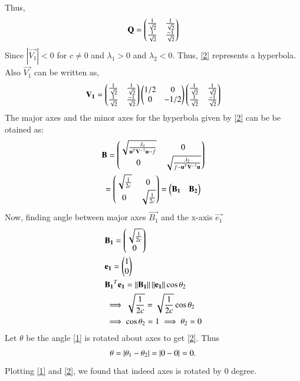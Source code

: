 \documentclass[journal,12pt,twocolumn]{IEEEtran}
\begin{document}
Thus, 
\begin{align}
	\mathbf{Q} = \begin{pmatrix}\frac{1}{\sqrt{2}} & \frac{1}{\sqrt{2}} \\ \frac{1}{\sqrt{2}} & \frac{-1}{\sqrt{2}}\end{pmatrix}
\end{align}
Since $|\vec{V_1}| <0$ for $c \not= 0$ and $\lambda_1 >0$ and $\lambda_2< 0$. Thus, \eqref{2} represents a hyperbola.\\
Also $\vec{V_1}$ can be written as,
\begin{align}
	\mathbf{V_1} = \begin{pmatrix}\frac{1}{\sqrt{2}} & \frac{1}{\sqrt{2}} \\ \frac{1}{\sqrt{2}} & \frac{-1}{\sqrt{2}}\end{pmatrix} 
	\begin{pmatrix}1/2 & 0 \\ 0 & -1/2 \end{pmatrix}\begin{pmatrix}\frac{1}{\sqrt{2}} & \frac{1}{\sqrt{2}} \\ \frac{1}{\sqrt{2}} & \frac{-1}{\sqrt{2}}\end{pmatrix}
\end{align}
The major axes and the minor axes for the hyperbola given by \eqref{2} can be be otained as:
\begin{multline}
	\mathbf{B} = \begin{pmatrix}\sqrt{\frac{\lambda_1}{\mathbf{u}^T\mathbf{V^-}^1\mathbf{u}-f}} & 0 \\ 0 & \sqrt{\frac{\lambda_2}{f-\mathbf{u}^T\mathbf{V^-}^1\mathbf{u}}} \end{pmatrix} \\ = \begin{pmatrix}\sqrt{\frac{1}{2c}} & 0 \\ 0 & \sqrt{\frac{1}{2c}} \end{pmatrix} =
	\begin{pmatrix}\mathbf{B_1} & \mathbf{B_2}\end{pmatrix}
\end{multline}
Now, finding angle between major axes $\vec{B_1}$ and the x-axis $\vec{e_1}$
\begin{align}
	& \mathbf{B_1} = \begin{pmatrix}\sqrt{\frac{1}{2c}} \\ 0\end{pmatrix}  \\
	& \mathbf{e_1} = \begin{pmatrix}1 \\ 0\end{pmatrix} \\
	& \mathbf{B_1}^T\mathbf{e_1} = \left\lVert\mathbf{B_1}\right\rVert\left\lVert\mathbf{e_1}\right\rVert\cos\theta_2 \\
	& \implies \sqrt{\frac{1}{2c}} = \sqrt{\frac{1}{2c}} \cos\theta_2 \\
	& \implies \cos\theta_2 = 1 \implies \theta_2 = 0 \label{6}
\end{align}
Let $\theta$ be the angle \eqref{1} is rotated about axes to get \eqref{2}. Thus
\begin{align}
	\theta = \left\vert\theta_1- \theta_2\right\vert = \left\vert0 - 0 \right\vert = 0.
\end{align}
Plotting \eqref{1} and \eqref{2}, we found that indeed axes is rotated by $0$ degree.
\end{document}
